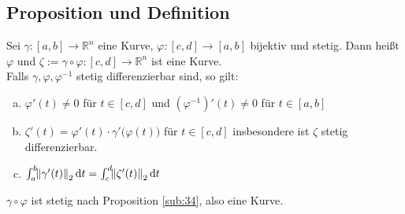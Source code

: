 \subsection[Parametertransformation]{Proposition und Definition} %
\label{sub:510}
Sei $\gamma : [a,b] \to \mathds{R}^n$ eine Kurve, $\varphi : [c,d] \to [a,b]$ bijektiv und stetig. Dann heißt $\varphi$  und 
$\zeta := \gamma \circ \varphi : [c,d] \to \mathds{R}^n$ ist eine Kurve. \\
Falls $\gamma, \varphi, \varphi ^{-1}$ stetig differenzierbar sind, so gilt: 
\begin{enumerate}[a)]
	\item $\varphi '(t) \not= 0$ für $t \in [c,d]$ und 
	$(\varphi ^{-1})'(t) \not= 0$ für $t \in [a,b]$
	\item $\zeta'(t) = \varphi ' (t ) \cdot \gamma ' \big( \varphi (t) \big)$ für $t \in [c,d]$ insbesondere ist $\zeta$ stetig differenzierbar.
	\item $\int_{a} ^{b} \! \norm[2]{\gamma'(t)}  \, \mathrm{d}t = \int_{c} ^{d} \! \norm[2]{\zeta'(t)}  \, \mathrm{d}t $
\end{enumerate}
$\gamma \circ \varphi$ ist stetig nach Proposition \ref{sub:34}, also eine Kurve.
